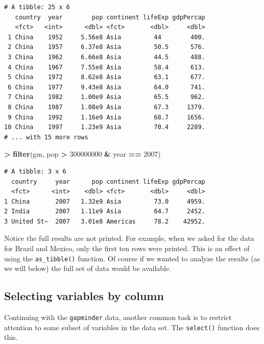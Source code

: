 \documentclass[
]{krantz}
\makeatletter
\newenvironment{Shaded}{\begin{snugshade}}{\end{snugshade}}
\newcommand{\DecValTok}[1]{\textcolor[rgb]{0.06,0.06,0.06}{#1}}
\newcommand{\KeywordTok}[1]{\textcolor[rgb]{0.27,0.27,0.27}{\textbf{#1}}}
\newcommand{\NormalTok}[1]{#1}
\newcommand{\OperatorTok}[1]{\textcolor[rgb]{0.43,0.43,0.43}{\textbf{#1}}}
\newcommand{\StringTok}[1]{\textcolor[rgb]{0.5,0.5,0.5}{#1}}
\newenvironment{kframe}{%
\medskip{}
\setlength{\fboxsep}{.8em}
 \def\at@end@of@kframe{}%
 \ifinner\ifhmode%
  \def\at@end@of@kframe{\end{minipage}}%
  \begin{minipage}{\columnwidth}%
 \fi\fi%
 \def\FrameCommand##1{\hskip\@totalleftmargin \hskip-\fboxsep
 \colorbox{shadecolor}{##1}\hskip-\fboxsep
     \hskip-\linewidth \hskip-\@totalleftmargin \hskip\columnwidth}%
 \MakeFramed {\advance\hsize-\width
   \@totalleftmargin\z@ \linewidth\hsize
   \@setminipage}}%
 {\par\unskip\endMakeFramed%
 \at@end@of@kframe}
\renewenvironment{Shaded}{\begin{kframe}}{\end{kframe}}
\makeatother
\begin{document}
\begin{verbatim}
# A tibble: 25 x 6
   country  year        pop continent lifeExp gdpPercap
   <fct>   <int>      <dbl> <fct>       <dbl>     <dbl>
 1 China    1952     5.56e8 Asia         44        400.
 2 China    1957     6.37e8 Asia         50.5      576.
 3 China    1962     6.66e8 Asia         44.5      488.
 4 China    1967     7.55e8 Asia         58.4      613.
 5 China    1972     8.62e8 Asia         63.1      677.
 6 China    1977     9.43e8 Asia         64.0      741.
 7 China    1982     1.00e9 Asia         65.5      962.
 8 China    1987     1.08e9 Asia         67.3     1379.
 9 China    1992     1.16e9 Asia         68.7     1656.
10 China    1997     1.23e9 Asia         70.4     2289.
# ... with 15 more rows
\end{verbatim}

\begin{Shaded}
\begin{Highlighting}[]
\OperatorTok{\textgreater{}}\StringTok{ }\KeywordTok{filter}\NormalTok{(gm, pop }\OperatorTok{\textgreater{}}\StringTok{ }\DecValTok{300000000} \OperatorTok{\&}\StringTok{ }\NormalTok{year }\OperatorTok{==}\StringTok{ }\DecValTok{2007}\NormalTok{)}
\end{Highlighting}
\end{Shaded}

\begin{verbatim}
# A tibble: 3 x 6
  country     year      pop continent lifeExp gdpPercap
  <fct>      <int>    <dbl> <fct>       <dbl>     <dbl>
1 China       2007   1.32e9 Asia         73.0     4959.
2 India       2007   1.11e9 Asia         64.7     2452.
3 United St~  2007   3.01e8 Americas     78.2    42952.
\end{verbatim}

Notice the full results are not printed. For example, when we asked for the data for Brazil and Mexico, only the first ten rows were printed. This is an effect of using the \texttt{as\_tibble()} function. Of course if we wanted to analyze the results (as we will below) the full set of data would be available.

\hypertarget{selecting-variables-by-column}{%
\subsection{Selecting variables by column}\label{selecting-variables-by-column}}

Continuing with the \texttt{gapminder} data, another common task is to restrict attention to some subset of variables in the data set. The \texttt{select()} function does this.
\end{document}
